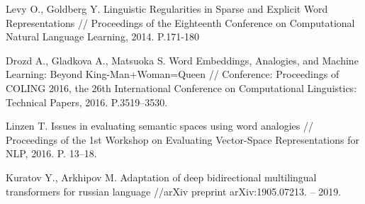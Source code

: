 \documentclass[a4paper,14pt]{article}
\begin{document}
\begin{thebibliography}{30}
Levy O., Goldberg Y. Linguistic Regularities in Sparse and Explicit Word 	Representations // Proceedings of the Eighteenth Conference on Computational Natural Language Learning, 2014. P.171-180

Drozd A., Gladkova A., Matsuoka S. Word Embeddings, Analogies, and Machine Learning: Beyond King-Man+Woman=Queen // Conference: Proceedings of COLING 2016, the 26th International Conference on Computational Linguistics: Technical Papers, 2016. 
P.3519–3530.

Linzen T. Issues in evaluating semantic spaces using word analogies // Proceedings of the 1st Workshop on Evaluating Vector-Space Representations for NLP, 2016. P. 13–18.

Kuratov Y., Arkhipov M. Adaptation of deep bidirectional multilingual transformers for russian language //arXiv preprint arXiv:1905.07213. – 2019.


\end{thebibliography}

\newpage
\end{document}
